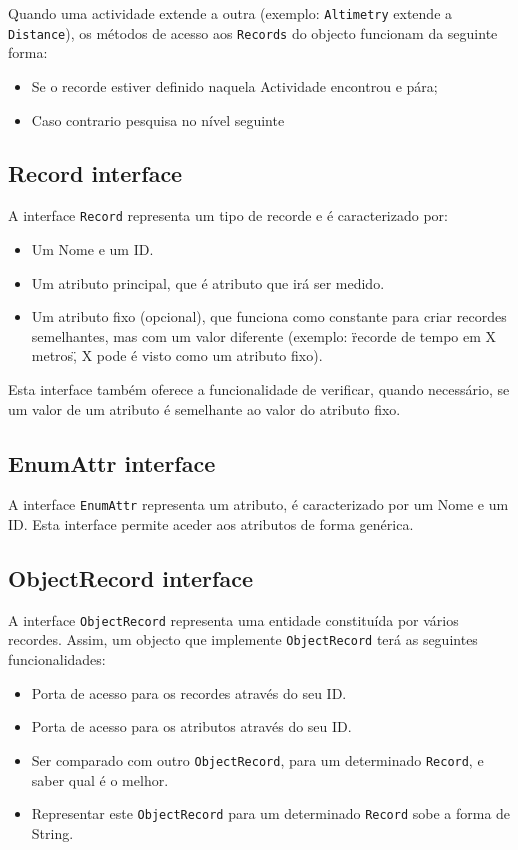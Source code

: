 \documentclass[a4paper,10pt]{report}
\begin{document}
Quando uma actividade extende a outra (exemplo: \verb!Altimetry! extende a \verb!Distance!), 
os métodos de acesso aos \verb!Records! do objecto funcionam da seguinte forma:
\begin{itemize}
 \item Se o recorde estiver definido naquela Actividade encontrou e pára;
 \item Caso contrario pesquisa no nível seguinte
\end{itemize}

\subsection{Record interface}
\label{subsec:record}
A interface \verb!Record! representa um tipo de recorde e é caracterizado por:
\begin{itemize}
 \item Um Nome e um ID. 
 \item Um atributo principal, que é atributo que irá ser medido.
 \item Um atributo fixo (opcional), que funciona como constante para criar recordes semelhantes, mas com um valor diferente 
	(exemplo: \"recorde de tempo em X metros\", X pode é visto como um atributo fixo).
\end{itemize}

Esta interface também oferece a funcionalidade de verificar, quando necessário, se um valor de um atributo é semelhante ao valor do atributo fixo.

\subsection{EnumAttr interface}
\label{subsec:enumAttr}
A interface \verb!EnumAttr! representa um atributo, é caracterizado por um Nome e um ID. 
Esta interface permite aceder aos atributos de forma genérica.

\subsection{ObjectRecord interface}
\label{subsec:objectRecord}
A interface \verb!ObjectRecord! representa uma entidade constituída por vários recordes. 
Assim, um objecto que implemente \verb!ObjectRecord! terá as seguintes funcionalidades:

\begin{itemize}
 \item Porta de acesso para os recordes através do seu ID.
 \item Porta de acesso para os atributos através do seu ID.
 \item Ser comparado com outro \verb!ObjectRecord!, para um determinado \verb!Record!, e saber qual é o melhor.
 \item Representar este \verb!ObjectRecord! para um determinado \verb!Record! sobe a forma de String.
\end{itemize}
\end{document}

